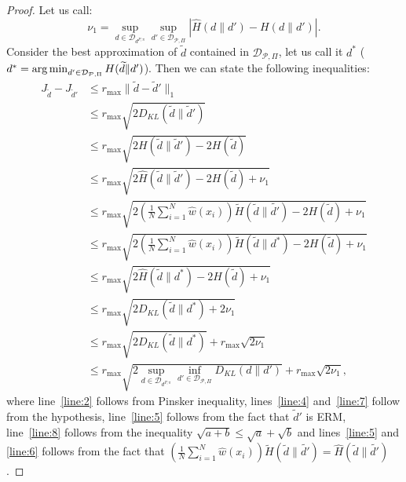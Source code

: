 \begin{proof}
Let us call:
\begin{equation}
	\nu_1 = \sup_{d \in \mathcal{D}_{d^{P,\pi}}} \sup_{d' \in \mathcal{D}_{\mathcal{P}, \Pi}} \left| \widehat{H} (d \| d') -  H(d \| d') \right|.
\end{equation}
Consider the best approximation of $\widetilde{d}$ contained in $\mathcal{D}_{\mathcal{P}, \Pi}$, let us call it $d^*$ 	\newline ($d^* = \operatorname*{arg\,min}_{d' \in \mathcal{D}_{\mathcal{P}, \Pi}} H(\widetilde{d} \| d')$).
Then we can state the following inequalities:
\begin{align}
	J_{\widetilde{d}} - J_{\widetilde{d}'} & \le r_{\max} \| \widetilde{d} - \widetilde{d}' \|_1  \label{line:1}\\
		& \le r_{\max} \sqrt{2 D_{KL} ( \widetilde{d} \| \widetilde{d}') }  \label{line:2}\\
		& \le r_{\max} \sqrt{2 H ( \widetilde{d} \| \widetilde{d}') - 2H(\widetilde{d})}  \label{line:3}\\
		& \le r_{\max} \sqrt{2 \widehat{H} ( \widetilde{d} \| \widetilde{d}') - 2H(\widetilde{d}) + \nu_1} \label{line:4} \\
		& \le r_{\max} \sqrt{2 \left( \frac{1}{N} \sum_{i=1}^{N} \widehat{w}(x_i) \right) \widetilde{H} ( \widetilde{d} \| \widetilde{d'}) - 2H(\widetilde{d}) + \nu_1}  \label{line:5}\\
		& \le r_{\max} \sqrt{2 \left( \frac{1}{N} \sum_{i=1}^{N} \widehat{w}(x_i) \right) \widetilde{H} ( \widetilde{d} \| d^*) - 2H(\widetilde{d}) + \nu_1}  \label{line:6}\\
		& \le r_{\max} \sqrt{2 \widehat{H} ( \widetilde{d} \| d^*) - 2H(\widetilde{d}) + \nu_1}  \label{line:7}\\
		& \le r_{\max} \sqrt{2 D_{KL}( \widetilde{d} \| d^*) + 2 \nu_1}  \label{line:7}\\
		& \le r_{\max} \sqrt{2 D_{KL}( \widetilde{d} \| d^*)} + r_{\max} \sqrt{2 \nu_1}  \label{line:8}\\
		& \le r_{\max} \sqrt{2 \sup_{d \in \mathcal{D}_{d^{P,\pi}}}  \inf_{d' \in \mathcal{D}_{\mathcal{P}, \Pi}}  D_{KL}( d \| d')} + r_{\max} \sqrt{2 \nu_1}, \label{line:9}
\end{align}
where line~\eqref{line:2} follows from Pinsker inequality, lines~\eqref{line:4} and~\eqref{line:7} follow from the hypothesis, line~\eqref{line:5} follows from the fact that $\widetilde{d}'$ is ERM, line~\eqref{line:8} follows from the inequality $\sqrt{a+b} \le \sqrt{a}+\sqrt{b}$ and lines~\eqref{line:5} and \eqref{line:6} follows from the fact that $\left( \frac{1}{N} \sum_{i=1}^{N} \widehat{w}(x_i) \right) \widetilde{H} ( \widetilde{d} \| \widetilde{d'}) = \widehat{H}( \widetilde{d} \| \widetilde{d'})$.
\end{proof}

